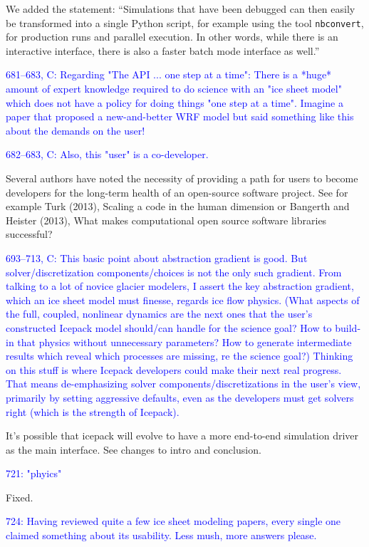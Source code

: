 \documentclass{article}
\theoremstyle{definition}
\theoremstyle{plain}
\begin{document}
We added the statement: ``Simulations that have been debugged can then easily be transformed into a single Python script, for example using the tool \texttt{nbconvert}, for production runs and parallel execution.
In other words, while there is an interactive interface, there is also a faster batch mode interface as well.''

\textcolor{blue}{681--683, C:  Regarding "The API ... one step at a time":  There is a *huge* amount of expert knowledge required to do science with an "ice sheet model" which does not have a policy for doing things "one step at a time".  Imagine a paper that proposed a new-and-better WRF model but said something like this about the demands on the user!}

\textcolor{blue}{682--683, C:  Also, this "user" is a co-developer.}

Several authors have noted the necessity of providing a path for users to become developers for the long-term health of an open-source software project.
See for example Turk (2013), Scaling a code in the human dimension or Bangerth and Heister (2013), What makes computational open source software libraries successful?

\textcolor{blue}{693--713, C:  This basic point about abstraction gradient is good.  But solver/discretization components/choices is not the only such gradient.  From talking to a lot of novice glacier modelers, I assert the key abstraction gradient, which an ice sheet model must finesse, regards ice flow physics.  (What aspects of the full, coupled, nonlinear dynamics are the next ones that the user's constructed Icepack model should/can handle for the science goal?  How to build-in that physics without unnecessary parameters?  How to generate intermediate results which reveal which processes are missing, re the science goal?)  Thinking on this stuff is where Icepack developers could make their next real progress.  That means de-emphasizing solver components/discretizations in the user's view, primarily by setting aggressive defaults, even as the developers must get solvers right (which is the strength of Icepack).}

It's possible that icepack will evolve to have a more end-to-end simulation driver as the main interface.
See changes to intro and conclusion.

\textcolor{blue}{721:  "phyics"}

Fixed.

\textcolor{blue}{724:  Having reviewed quite a few ice sheet modeling papers, every single one claimed something about its usability.  Less mush, more answers please.}
\end{document}
